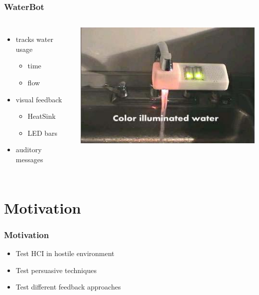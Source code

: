 \documentclass{beamer}
\begin{document}
\begin{frame}
  \frametitle{WaterBot}
  \begin{columns}[c]
    \begin{itemize}
    \item tracks water usage
      \begin{itemize}
      \item time
      \item flow
      \end{itemize}
    \item visual feedback
      \begin{itemize}
      \item HeatSink
      \item LED bars
      \end{itemize}
    \item auditory messages
    \end{itemize}
    \includegraphics[width=\textwidth]{Bilder/WaterBot.jpg}
  \end{columns}


\end{frame}








\section{Motivation}
\begin{frame}
	\frametitle{Motivation}
	\begin{itemize}
	  \item Test HCI in hostile environment
	  \item Test persuasive techniques
          \item Test different feedback approaches
        \end{itemize}          

\end{frame}
\end{document}
